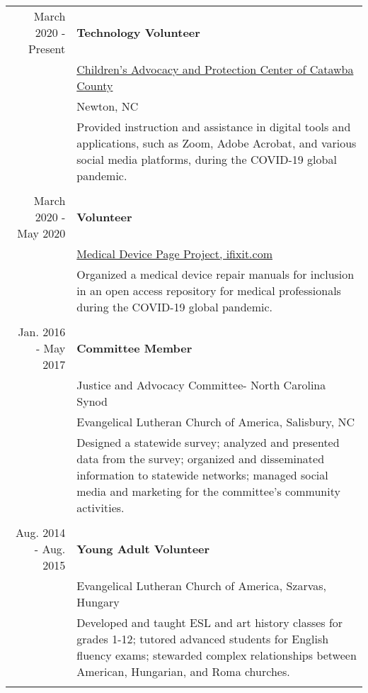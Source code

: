 \documentclass[a4paper,10pt]{article}
\begin{document}
\begin{tabular}{r|p{11cm}}
 {March 2020 - Present} & \textbf{Technology Volunteer}\\
 & \href{http://catawbacountycapc.org/capc/}{Children's Advocacy and Protection Center of Catawba County} \\
 &Newton, NC \\
 &\footnotesize{Provided instruction and assistance in digital tools and applications, such as Zoom, Adobe Acrobat, and various social media platforms, during the COVID-19 global pandemic.}\\\multicolumn{2}{c}{} \\
 
  {March 2020 - May 2020} & \textbf{Volunteer}\\
 & \href{https://www.ifixit.com/Wiki/Medical_Device_Page_Project_Guidelines#Section_Background}{Medical Device Page Project, ifixit.com}\\
 &\footnotesize{Organized a medical device repair manuals  for inclusion in an open access repository for medical professionals during the COVID-19 global pandemic. }\\\multicolumn{2}{c}{} \\
 
 {Jan. 2016 - May 2017} & \textbf{Committee Member}\\
 &Justice and Advocacy Committee- North Carolina Synod \\
 &Evangelical Lutheran Church of America, Salisbury, NC \\
 &\footnotesize{Designed a statewide survey; analyzed and presented data from the survey; organized and disseminated information to statewide networks; managed social media and marketing for the committee's community activities. }\\\multicolumn{2}{c}{} \\
 
 {Aug. 2014 - Aug. 2015} & \textbf{Young Adult Volunteer}\\
 &Evangelical Lutheran Church of America, Szarvas, Hungary \\
 &\footnotesize{Developed and taught ESL and art history classes for grades 1-12; tutored advanced students for English fluency exams; stewarded complex relationships between American, Hungarian, and Roma churches.}\\\multicolumn{2}{c}{} \\

 \end{tabular}

\end{document}
